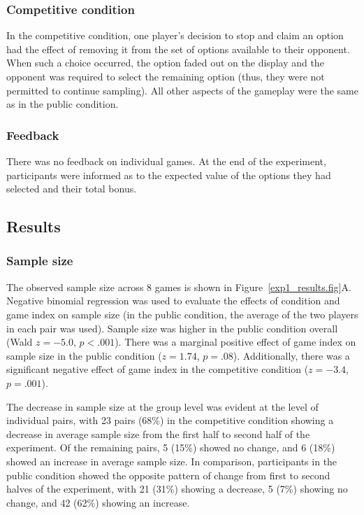 \documentclass[11pt,jou]{apa6}
\begin{document}
\subsubsection{Competitive condition}

In the competitive condition, one player's decision to stop and claim an option had the effect of removing it from the set of options available to their opponent.
When such a choice occurred, the option faded out on the display and the opponent was required to select the remaining option (thus, they were not permitted to continue sampling).
All other aspects of the gameplay were the same as in the public condition.

\subsubsection{Feedback}

There was no feedback on individual games.
At the end of the experiment, participants were informed as to the expected value of the options they had selected and their total bonus.



\subsection{Results}

\subsubsection{Sample size}

The observed sample size across 8 games is shown in Figure~\ref{exp1_results.fig}A.
Negative binomial regression was used to evaluate the effects of condition and game index on sample size (in the public condition, the average of the two players in each pair was used).
Sample size was higher in the public condition overall (Wald $z=-5.0$, $p<.001$).
There was a marginal positive effect of game index on sample size in the public condition ($z=1.74$, $p=.08$).
Additionally, there was a significant negative effect of game index in the competitive condition ($z=-3.4$, $p=.001$).

The decrease in sample size at the group level was evident at the level of individual pairs, with 23 pairs (68\%) in the competitive condition showing a decrease in average sample size from the first half to second half of the experiment. Of the remaining pairs, 5 (15\%) showed no change, and 6 (18\%) showed an increase in average sample size.
In comparison, participants in the public condition showed the opposite pattern of change from first to second halves of the experiment, with 21 (31\%) showing a decrease, 5 (7\%) showing no change, and 42 (62\%) showing an increase.
\end{document}
